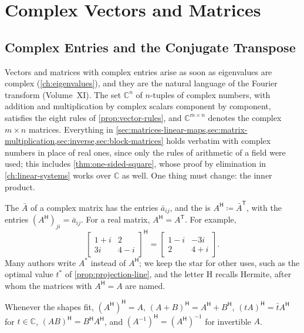 \section{Complex Vectors and Matrices}
\label{sec:complex-matrices}

\subsection{Complex Entries and the Conjugate Transpose}

Vectors and matrices with complex entries arise as soon as eigenvalues are complex (\cref{ch:eigenvalues}), and they are the natural language of the Fourier transform (Volume~XI). The set $\mathbb C^n$ of $n$-tuples of complex numbers, with addition and multiplication by complex scalars component by component, satisfies the eight rules of \cref{prop:vector-rules}, and $\mathbb C^{m\times n}$ denotes the complex $m\times n$ matrices. Everything in \cref{sec:matrices-linear-maps,sec:matrix-multiplication,sec:inverse,sec:block-matrices} holds verbatim with complex numbers in place of real ones, since only the rules of arithmetic of a field were used; this includes \cref{thm:one-sided-square}, whose proof by elimination in \cref{ch:linear-systems} works over $\mathbb C$ as well. One thing must change: the inner product.

The  $\bar A$ of a complex matrix has the entries $\bar a_{ij}$, and the  is $A^{\mathsf H}\coloneqq\bar A^{\mathsf T}$, with the entries $(A^{\mathsf H})_{ji}=\bar a_{ij}$. For a real matrix, $A^{\mathsf H}=A^{\mathsf T}$. For example,
\[
\begin{bmatrix}1+i&2\\3i&4-i\end{bmatrix}^{\mathsf H}=\begin{bmatrix}1-i&-3i\\2&4+i\end{bmatrix}.
\]
Many authors write $A^*$ instead of $A^{\mathsf H}$; we keep the star for other uses, such as the optimal value $t^*$ of \cref{prop:projection-line}, and the letter H recalls Hermite, after whom the matrices with $A^{\mathsf H}=A$ are named.

\begin{proposition}
\label{prop:conjugate-transpose}
Whenever the shapes fit, $(A^{\mathsf H})^{\mathsf H}=A$, $(A+B)^{\mathsf H}=A^{\mathsf H}+B^{\mathsf H}$, $(tA)^{\mathsf H}=\bar tA^{\mathsf H}$ for $t\in\mathbb C$, $(AB)^{\mathsf H}=B^{\mathsf H}A^{\mathsf H}$, and $(A^{-1})^{\mathsf H}=(A^{\mathsf H})^{-1}$ for invertible $A$.
\end{proposition}

